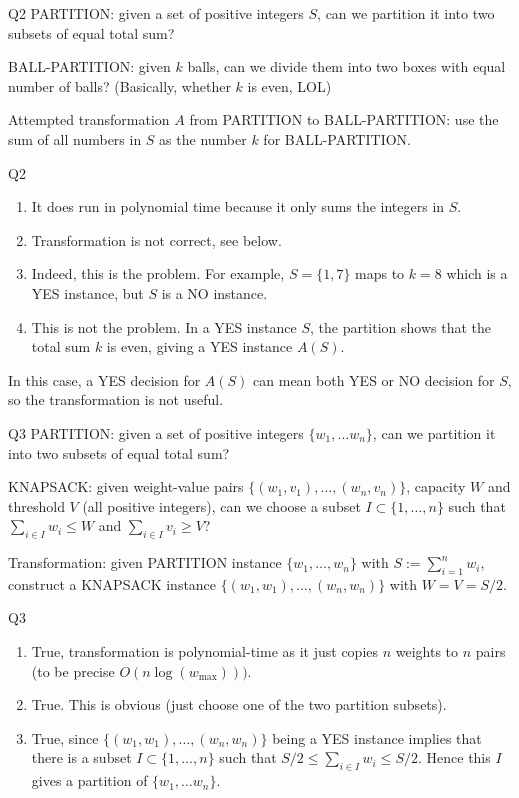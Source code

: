 \documentclass[t]{beamer}
\def\le{\leqslant}
\def\ge{\geqslant}
\begin{document}
\begin{frame}{Q2}
  PARTITION: given a set of positive integers $S$, can we partition it into two subsets of equal total sum?
  \par BALL-PARTITION: given $k$ balls, can we divide them into two boxes with equal number of balls? (Basically, whether $k$ is even, LOL)
  \par Attempted transformation $A$ from PARTITION to BALL-PARTITION: use the sum of all numbers in $S$ as the number $k$ for BALL-PARTITION. 
\end{frame}
\begin{frame}{Q2}
  \begin{enumerate}
    \item It does run in polynomial time because it only sums the integers in $S$. 
    \item Transformation is not correct, see below. 
    \item Indeed, this is the problem. For example, $S = \{1, 7\}$ maps to $k=8$ which is a YES instance, but $S$ is a NO instance. 
    \item This is not the problem. In a YES instance $S$, the partition shows that the total sum $k$ is even, giving a YES instance $A(S)$. 
  \end{enumerate}
  In this case, a YES decision for $A(S)$ can mean both YES or NO decision for $S$, so the transformation is not useful. 
\end{frame}
\begin{frame}{Q3}
  PARTITION: given a set of positive integers $\{w_1, \dots w_n\}$, can we partition it into two subsets of equal total sum?
  \par KNAPSACK: given weight-value pairs $\{(w_1, v_1), \dots, (w_n, v_n)\}$, capacity $W$ and threshold $V$ (all positive integers), can we choose a subset $I \subset \{1, \dots, n\}$ such that $\sum_{i \in I}w_i \le W$ and $\sum_{i \in I}v_i \ge V$?
  \par Transformation: given PARTITION instance $\{w_1, \dots, w_n\}$ with $S := \sum_{i=1}^{n}w_i$, construct a KNAPSACK instance $\{(w_1, w_1), \dots, (w_n, w_n)\}$ with $W = V = S/2$. 
\end{frame}
\begin{frame}{Q3}
  \begin{enumerate}
    \item True, transformation is polynomial-time as it just copies $n$ weights to $n$ pairs (to be precise $O(n\log(w_{\text{max}})))$. 
    \item True. This is obvious (just choose one of the two partition subsets).
    \item True, since $\{(w_1, w_1), \dots, (w_n, w_n)\}$ being a YES instance implies that there is a subset $I \subset \{1, \dots, n\}$ such that $S/2 \le \sum_{i\in I} w_i \le S/2$. Hence this $I$ gives a partition of $\{w_1, \dots w_n\}$. 
  \end{enumerate}
\end{frame}
\end{document}
